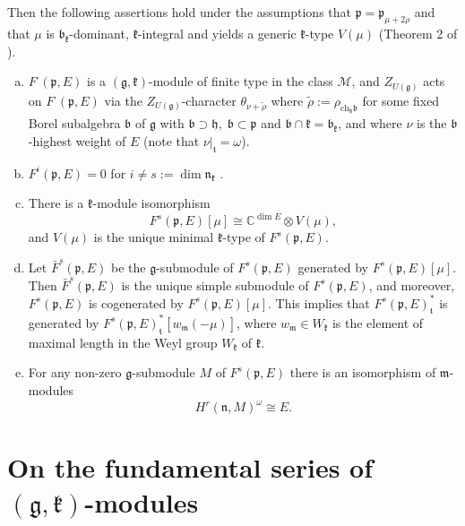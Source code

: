 \documentclass[11pt]{amsart}
\renewcommand{\tt}{\mathfrak{t}}
\newcommand{\kk}{\mathfrak{k}}
\newcommand{\nn}{\mathfrak{n}}
\newcommand{\mm}{\mathfrak{m}}
\newcommand{\hh}{\mathfrak{h}}
\newcommand{\pp}{\mathfrak{p}}
\renewcommand{\gg}{\mathfrak{g}}
\newcommand{\bb}{\mathfrak{b}}
\newcommand{\ch}{\mathrm{ch}}
\newcommand{\field}[1]{\mathbb{#1}}
\begin{document}
Then the following assertions hold under the assumptions that $\pp=\pp_{\mu+2\rho}$ and that $\mu$ is $\bb_\kk$-dominant, $\kk$-integral and yields a generic $\kk$-type $V(\mu)$ (Theorem 2 of \cite{PZ2}).
\begin{enumerate}[a)]
\item $F^\cdot(\pp,E)$ is a $(\gg,\kk)$-module of finite type in the class $\mathcal{M}$, and $Z_{U(\gg)}$ acts on $F^\cdot(\pp,E)$ via the $Z_{U(\gg)}$-character $\theta_{\nu+\tilde{\rho}}$ where $\tilde{\rho}:=\rho_{\ch_\hh\bb}$ for some fixed Borel subalgebra $\bb$ of $\gg$ with $\bb\supset\hh,\;\bb\subset\pp$ and $\bb\cap\kk=\bb_\kk$, and where $\nu$ is the $\bb$-highest weight of $E$ (note that $\nu|_\tt=\omega$).
\item $F^i(\pp,E)=0$ for $i\neq s:=\dim\nn_\kk$ .
\item There is a $\kk$-module isomorphism $$F^s(\pp,E)[\mu]\cong\field{C}^{\dim E}\otimes V(\mu),$$ and $V(\mu)$ is the unique minimal $\kk$-type of $F^s(\pp,E)$.
\item Let $\bar{F}^s(\pp,E)$ be the $\gg$-submodule of $F^s(\pp,E)$ generated by $F^s(\pp,E)[\mu]$. Then $\bar{F}^s(\pp,E)$ is the unique simple submodule of $F^s(\pp,E)$, and moreover, $F^s(\pp,E)$ is cogenerated by $F^s(\pp,E)[\mu]$. This implies that $F^s(\pp,E)^*_\tt$ is generated by $F^s(\pp,E)^*_\tt[w_\mm(-\mu)]$, where $w_\mm\in W_\kk$  is the element of maximal length in the Weyl group $W_\kk$ of $\kk$.
\item For any non-zero $\gg$-submodule $M$ of $F^s(\pp,E)$ there is an isomorphism of $\mm$-modules $$H^r(\nn,M)^\omega\cong E.$$
\end{enumerate}

\section{On the fundamental series of $(\gg,\kk)$-modules}
\end{document}
